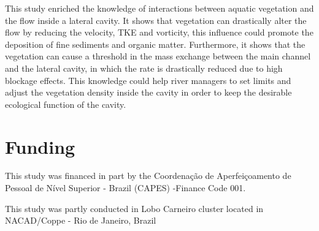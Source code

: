 This study enriched the knowledge of interactions between aquatic vegetation and the flow inside a lateral cavity. It shows that vegetation can drastically alter the flow by reducing the velocity, TKE and vorticity, this influence could promote the deposition of fine sediments and organic matter. Furthermore, it shows that the vegetation can cause a threshold in the mass exchange between the main channel and the lateral cavity, in which the rate is drastically reduced due to high blockage effects. This knowledge could help river managers to set limits and adjust the vegetation density inside the cavity in order to keep the desirable ecological function of the cavity.

\section*{Funding}
This study was financed in part by the Coordenação de Aperfeiçoamento de Pessoal de Nível Superior - Brazil (CAPES) -Finance Code 001.

This study was partly conducted in Lobo Carneiro cluster located in NACAD/Coppe - Rio de Janeiro, Brazil

\printbibliography[segment=\therefsegment,heading=subbibliography, title={References}]